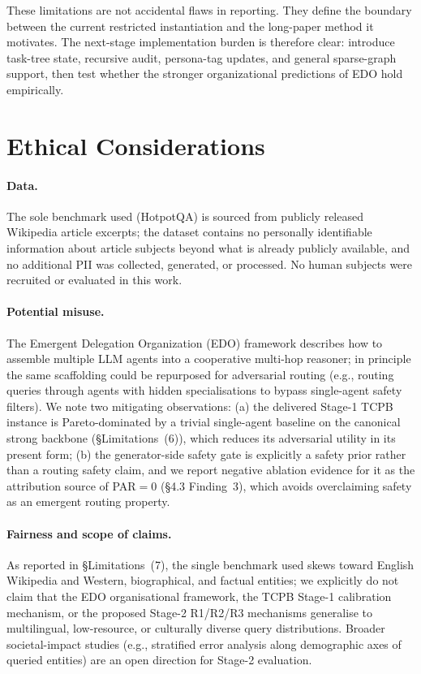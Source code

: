 \documentclass[11pt]{article}
\begin{document}
These limitations are not accidental flaws in reporting. They define the boundary between the current restricted instantiation and the long-paper method it motivates. The next-stage implementation burden is therefore clear: introduce task-tree state, recursive audit, persona-tag updates, and general sparse-graph support, then test whether the stronger organizational predictions of EDO hold empirically.

\section*{Ethical Considerations}
\label{sec:ethics}

\paragraph{Data.} The sole benchmark used (HotpotQA) is sourced from publicly released Wikipedia article excerpts; the dataset contains no personally identifiable information about article subjects beyond what is already publicly available, and no additional PII was collected, generated, or processed. No human subjects were recruited or evaluated in this work.

\paragraph{Potential misuse.} The Emergent Delegation Organization (EDO) framework describes how to assemble multiple LLM agents into a cooperative multi-hop reasoner; in principle the same scaffolding could be repurposed for adversarial routing (e.g., routing queries through agents with hidden specialisations to bypass single-agent safety filters). We note two mitigating observations: (a) the delivered Stage-1 TCPB instance is Pareto-dominated by a trivial single-agent baseline on the canonical strong backbone (\S Limitations~(6)), which reduces its adversarial utility in its present form; (b) the generator-side safety gate is explicitly a safety prior rather than a routing safety claim, and we report negative ablation evidence for it as the attribution source of PAR$=0$ (\S 4.3 Finding~3), which avoids overclaiming safety as an emergent routing property.

\paragraph{Fairness and scope of claims.} As reported in \S Limitations~(7), the single benchmark used skews toward English Wikipedia and Western, biographical, and factual entities; we explicitly do not claim that the EDO organisational framework, the TCPB Stage-1 calibration mechanism, or the proposed Stage-2 R1/R2/R3 mechanisms generalise to multilingual, low-resource, or culturally diverse query distributions. Broader societal-impact studies (e.g., stratified error analysis along demographic axes of queried entities) are an open direction for Stage-2 evaluation.
\end{document}
